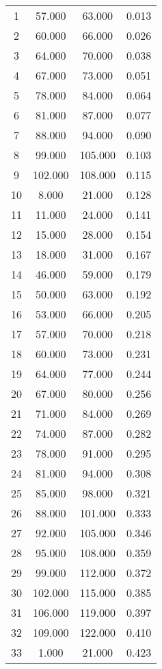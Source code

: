 % 
\begin{tabular}{cccc}
  \hline
  \hline
1 & 57.000 & 63.000 & 0.013 \\ 
  2 & 60.000 & 66.000 & 0.026 \\ 
  3 & 64.000 & 70.000 & 0.038 \\ 
  4 & 67.000 & 73.000 & 0.051 \\ 
  5 & 78.000 & 84.000 & 0.064 \\ 
  6 & 81.000 & 87.000 & 0.077 \\ 
  7 & 88.000 & 94.000 & 0.090 \\ 
  8 & 99.000 & 105.000 & 0.103 \\ 
  9 & 102.000 & 108.000 & 0.115 \\ 
  10 & 8.000 & 21.000 & 0.128 \\ 
  11 & 11.000 & 24.000 & 0.141 \\ 
  12 & 15.000 & 28.000 & 0.154 \\ 
  13 & 18.000 & 31.000 & 0.167 \\ 
  14 & 46.000 & 59.000 & 0.179 \\ 
  15 & 50.000 & 63.000 & 0.192 \\ 
  16 & 53.000 & 66.000 & 0.205 \\ 
  17 & 57.000 & 70.000 & 0.218 \\ 
  18 & 60.000 & 73.000 & 0.231 \\ 
  19 & 64.000 & 77.000 & 0.244 \\ 
  20 & 67.000 & 80.000 & 0.256 \\ 
  21 & 71.000 & 84.000 & 0.269 \\ 
  22 & 74.000 & 87.000 & 0.282 \\ 
  23 & 78.000 & 91.000 & 0.295 \\ 
  24 & 81.000 & 94.000 & 0.308 \\ 
  25 & 85.000 & 98.000 & 0.321 \\ 
  26 & 88.000 & 101.000 & 0.333 \\ 
  27 & 92.000 & 105.000 & 0.346 \\ 
  28 & 95.000 & 108.000 & 0.359 \\ 
  29 & 99.000 & 112.000 & 0.372 \\ 
  30 & 102.000 & 115.000 & 0.385 \\ 
  31 & 106.000 & 119.000 & 0.397 \\ 
  32 & 109.000 & 122.000 & 0.410 \\ 
  33 & 1.000 & 21.000 & 0.423 \\ 

\end{tabular}
